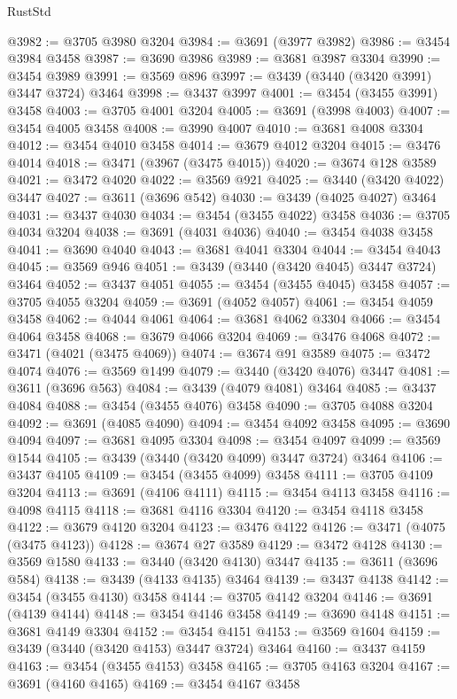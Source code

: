 \begin{lexlean}{RustStd}
\begin{coremodule}
{{{{{{{{{{{{{{{{{{{@3982 := @3705 @3980 @3204
@3984 := @3691 (@3977 @3982)
@3986 := @3454 @3984 @3458
@3987 := @3690 @3986
@3989 := @3681 @3987 @3304
@3990 := @3454 @3989
@3991 := @3569 @896
@3997 := @3439 (@3440 (@3420 @3991) @3447 @3724) @3464
@3998 := @3437 @3997
@4001 := @3454 (@3455 @3991) @3458
@4003 := @3705 @4001 @3204
@4005 := @3691 (@3998 @4003)
@4007 := @3454 @4005 @3458
@4008 := @3990 @4007
@4010 := @3681 @4008 @3304
@4012 := @3454 @4010 @3458
@4014 := @3679 @4012 @3204
@4015 := @3476 @4014
@4018 := @3471 (@3967 (@3475 @4015))
@4020 := @3674 @128 @3589
@4021 := @3472 @4020
@4022 := @3569 @921
@4025 := @3440 (@3420 @4022) @3447
@4027 := @3611 (@3696 @542)
@4030 := @3439 (@4025 @4027) @3464
@4031 := @3437 @4030
@4034 := @3454 (@3455 @4022) @3458
@4036 := @3705 @4034 @3204
@4038 := @3691 (@4031 @4036)
@4040 := @3454 @4038 @3458
@4041 := @3690 @4040
@4043 := @3681 @4041 @3304
@4044 := @3454 @4043
@4045 := @3569 @946
@4051 := @3439 (@3440 (@3420 @4045) @3447 @3724) @3464
@4052 := @3437 @4051
@4055 := @3454 (@3455 @4045) @3458
@4057 := @3705 @4055 @3204
@4059 := @3691 (@4052 @4057)
@4061 := @3454 @4059 @3458
@4062 := @4044 @4061
@4064 := @3681 @4062 @3304
@4066 := @3454 @4064 @3458
@4068 := @3679 @4066 @3204
@4069 := @3476 @4068
@4072 := @3471 (@4021 (@3475 @4069))
@4074 := @3674 @91 @3589
@4075 := @3472 @4074
@4076 := @3569 @1499
@4079 := @3440 (@3420 @4076) @3447
@4081 := @3611 (@3696 @563)
@4084 := @3439 (@4079 @4081) @3464
@4085 := @3437 @4084
@4088 := @3454 (@3455 @4076) @3458
@4090 := @3705 @4088 @3204
@4092 := @3691 (@4085 @4090)
@4094 := @3454 @4092 @3458
@4095 := @3690 @4094
@4097 := @3681 @4095 @3304
@4098 := @3454 @4097
@4099 := @3569 @1544
@4105 := @3439 (@3440 (@3420 @4099) @3447 @3724) @3464
@4106 := @3437 @4105
@4109 := @3454 (@3455 @4099) @3458
@4111 := @3705 @4109 @3204
@4113 := @3691 (@4106 @4111)
@4115 := @3454 @4113 @3458
@4116 := @4098 @4115
@4118 := @3681 @4116 @3304
@4120 := @3454 @4118 @3458
@4122 := @3679 @4120 @3204
@4123 := @3476 @4122
@4126 := @3471 (@4075 (@3475 @4123))
@4128 := @3674 @27 @3589
@4129 := @3472 @4128
@4130 := @3569 @1580
@4133 := @3440 (@3420 @4130) @3447
@4135 := @3611 (@3696 @584)
@4138 := @3439 (@4133 @4135) @3464
@4139 := @3437 @4138
@4142 := @3454 (@3455 @4130) @3458
@4144 := @3705 @4142 @3204
@4146 := @3691 (@4139 @4144)
@4148 := @3454 @4146 @3458
@4149 := @3690 @4148
@4151 := @3681 @4149 @3304
@4152 := @3454 @4151
@4153 := @3569 @1604
@4159 := @3439 (@3440 (@3420 @4153) @3447 @3724) @3464
@4160 := @3437 @4159
@4163 := @3454 (@3455 @4153) @3458
@4165 := @3705 @4163 @3204
@4167 := @3691 (@4160 @4165)
@4169 := @3454 @4167 @3458
}}}}}}}}}}}}}}}}}}}
\end{coremodule}
\end{lexlean}

